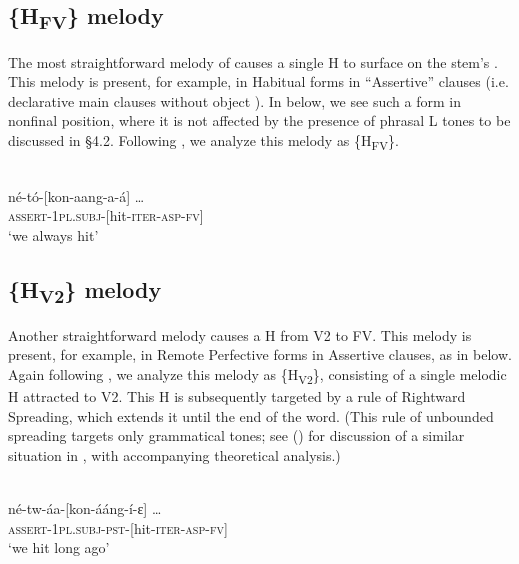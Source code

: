 \documentclass[output=paper
,newtxmath
,modfonts
,nonflat]{langsci/langscibook}
\begin{document}
\subsection{\{H\textsubscript{FV}\} melody}

The most straightforward melody of  causes a single H  to surface on the stem’s . This melody is present, for example, in Habitual forms in “Assertive” clauses (i.e. declarative main clauses without object ). In  below, we see such a form in nonfinal position, where it is not affected by the presence of phrasal L tones to be discussed in §4.2. Following \citet{Roberts-Kohno2014}, we analyze this melody as \{H\textsubscript{FV}\}.

\ea\label{ex:jones:3}
\\
\gll   né-tó-[kon-aang-a-á] …      \\
     \textsc{assert-1pl.subj-[}hit-\textsc{iter-asp-fv]}\\
\glt ‘we always hit’
\z

\subsection{\{H\textsubscript{V2}\} melody}

Another straightforward melody causes a H  from V2 to FV. This melody is present, for example, in Remote Perfective forms in Assertive clauses, as in  below. Again following \citet{Roberts-Kohno2014}, we analyze this melody as \{H\textsubscript{V2}\}, consisting of a single melodic H  attracted to V2. This H is subsequently targeted by a rule of Rightward Spreading, which extends it until the end of the word. (This rule of unbounded spreading targets only grammatical tones; see \citeauthor{Bickmore1997} (\citeyear{Bickmore1997,Bickmore1999}) for discussion of a similar situation in , with accompanying theoretical analysis.)

\ea\label{ex:jones:4}
\\
\gll   né-tw-áa-[kon-ááng-í-ɛ] …      \\
       \textsc{assert-1pl.subj-pst-[}hit-\textsc{iter-asp-fv]}\\
\glt   ‘we hit long ago’
\z
\end{document}

